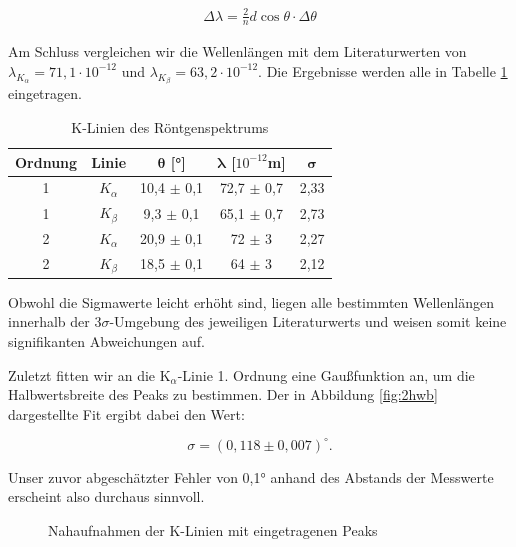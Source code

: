 \documentclass{article}
\begin{document}
\begin{equation}
    \begin{split}
        \Delta \lambda = \frac{2}{n} d \cos{\theta} \cdot \Delta \theta
    \end{split}
\end{equation}

Am Schluss vergleichen wir die Wellenlängen mit dem Literaturwerten von $\lambda_{K_\alpha} = 71,1 \cdot 10^{-12}$ und $\lambda_{K_\beta} = 63,2 \cdot 10^{-12}$. Die Ergebnisse werden alle in Tabelle \ref{tab:K_Linien} eingetragen.

\phantom{.}

\begin{table}[!h]
    \centering
    \begin{tabular}{ccccc}
        \hline
        \textbf{Ordnung} & \textbf{Linie} & $\bm{\theta}$ [°] & $\bm{\lambda}$ [$10^{-12}$m] & $\bm{\sigma}$  \\ \hline
          1 & $K_\alpha$     & 10,4 $\pm$  0,1 & 72,7 $\pm$ 0,7 & 2,33 \\
          1 & $K_\beta$      & 9,3  $\pm$  0,1 & 65,1  $\pm$ 0,7 & 2,73 \\
          2 & $K_\alpha$     & 20,9 $\pm$  0,1 & 72  $\pm$ 3   & 2,27 \\
          2 & $K_\beta$      & 18,5 $\pm$  0,1 & 64 $\pm$ 3   & 2,12  \\ \hline
    \end{tabular}%
    \caption{K-Linien des Röntgenspektrums}
    \label{tab:K_Linien}
\end{table}

\phantom{.}

Obwohl die Sigmawerte leicht erhöht sind, liegen alle bestimmten Wellenlängen innerhalb der 3$\sigma$-Umgebung des jeweiligen Literaturwerts und weisen somit keine signifikanten Abweichungen auf. 

Zuletzt fitten wir an die K$_\alpha$-Linie 1. Ordnung eine Gaußfunktion an, um die Halbwertsbreite des Peaks zu bestimmen. Der in Abbildung \ref{fig:2hwb} dargestellte Fit ergibt dabei den Wert:

\begin{equation}
    \sigma = (0,118 \pm 0,007)^\circ.
\end{equation}

Unser zuvor abgeschätzter Fehler von 0,1° anhand des Abstands der Messwerte erscheint also durchaus sinnvoll.

\begin{figure}[!p]
  \centering
  \hfill
  \hfill
  \caption{Nahaufnahmen der K-Linien mit eingetragenen Peaks}
  \label{fig:2K-Linien_Peaks}
\end{figure}
\end{document}
